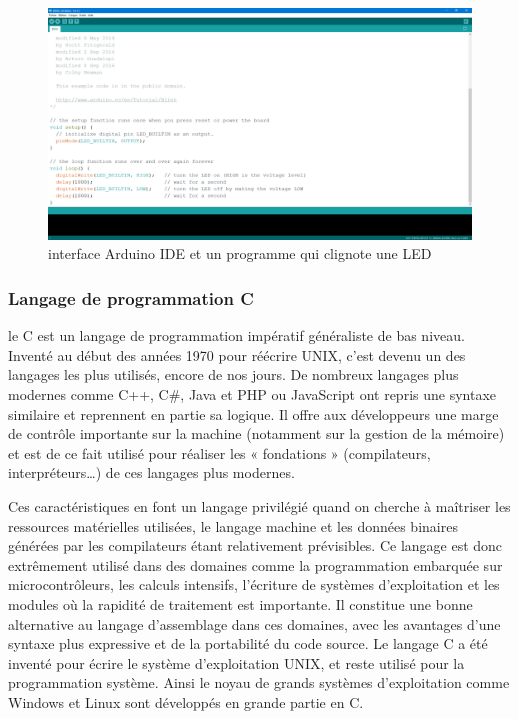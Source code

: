                 \begin{figure}[h!]
                    \centering
                    \includegraphics[scale=0.3]{images/arduino_ide.PNG}
                    \caption{interface Arduino IDE et un programme qui clignote une LED}
                    \label{fig61}
                \end{figure}
                
                
             \subsubsection{Langage de programmation C}
                le C est un langage de programmation impératif généraliste de bas niveau. Inventé au début des années 1970 pour réécrire UNIX, c’est devenu un des langages les plus utilisés, encore de nos jours. De nombreux langages plus modernes comme C++, C#, Java et PHP ou JavaScript ont repris une syntaxe similaire et reprennent en partie sa logique. Il offre aux développeurs une marge de contrôle importante sur la machine (notamment sur la gestion de la mémoire) et est de ce fait utilisé pour réaliser les « fondations » (compilateurs, interpréteurs…) de ces langages plus modernes.

                Ces caractéristiques en font un langage privilégié quand on cherche à maîtriser les ressources matérielles utilisées, le langage machine et les données binaires générées par les compilateurs étant relativement prévisibles. Ce langage est donc extrêmement utilisé dans des domaines comme la programmation embarquée sur microcontrôleurs, les calculs intensifs, l’écriture de systèmes d’exploitation et les modules où la rapidité de traitement est importante. Il constitue une bonne alternative au langage d’assemblage dans ces domaines, avec les avantages d’une syntaxe plus expressive et de la portabilité du code source. Le langage C a été inventé pour écrire le système d’exploitation UNIX, et reste utilisé pour la programmation système. Ainsi le noyau de grands systèmes d’exploitation comme Windows et Linux sont développés en grande partie en C.
                
